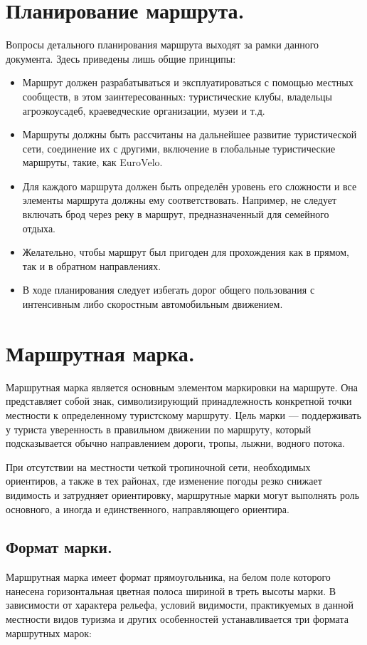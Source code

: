\documentclass[a4paper,12pt]{extarticle}
\begin{document}
\section{Планирование маршрута.}

Вопросы детального планирования маршрута выходят за рамки данного документа. Здесь приведены лишь общие принципы:
\begin{itemize}
	\item Маршрут должен разрабатываться и эксплуатироваться с помощью местных сообществ, в этом заинтересованных:
		туристические клубы, владельцы агроэкоусадеб, краеведческие организации, музеи и т.д.
	\item Маршруты должны быть рассчитаны на дальнейшее развитие туристической сети, соединение их с другими,
		включение в глобальные туристические маршруты, такие, как EuroVelo.
	\item Для каждого маршрута должен быть определён уровень его сложности и все элементы маршрута должны ему
		соответствовать. Например, не следует включать брод через реку в маршрут, предназначенный для семейного
		отдыха.
	\item Желательно, чтобы маршрут был пригоден для прохождения как в прямом, так и в обратном направлениях.
	\item В ходе планирования следует избегать дорог общего пользования с интенсивным либо скоростным автомобильным
		движением.
\end{itemize}


\section{Маршрутная марка.}

Маршрутная марка является основным элементом маркировки на маршруте. Она представляет собой знак, символизирующий
принадлежность конкретной точки местности к определенному туристскому маршруту. Цель марки --- поддерживать у туриста
уверенность в правильном движении по маршруту, который подсказывается обычно направлением дороги, тропы, лыжни, водного
потока.

При отсутствии на местности четкой тропиночной сети, необходимых ориентиров, а также в тех районах, где изменение погоды
резко снижает видимость и затрудняет ориентировку, маршрутные марки могут выполнять роль основного, а иногда и
единственного, направляющего ориентира.

\subsection{Формат марки.}
Маршрутная марка имеет формат прямоугольника, на белом поле которого нанесена горизонтальная цветная полоса шириной в
треть высоты марки. В зависимости от характера рельефа, условий видимости, практикуемых в данной местности видов туризма и других особенностей устанавливается три
формата маршрутных марок:
\end{document}

